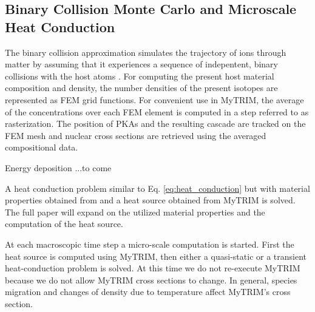 \documentclass{anstrans}
\begin{document}
\subsection{Binary Collision Monte Carlo and Microscale Heat Conduction}
The binary collision approximation simulates the trajectory of ions through matter by assuming that it experiences a sequence of indepentent, binary collisions with the host atoms \cite{SRIM}. For computing the present host material composition and density, the number densities of the present isotopes are represented as FEM grid functions. For convenient use in MyTRIM, the average of the concentrations over each FEM element is computed in a step referred to as rasterization. The position of PKAs and the resulting cascade are tracked on the FEM mesh and nuclear cross sections are retrieved using the averaged compositional data. 

Energy deposition ...to come

A heat conduction problem similar to Eq. \ref{eq:heat_conduction} but with material properties obtained from \cite{Mo2015} and a heat source obtained from MyTRIM is solved. The full paper will expand on the utilized material properties and the computation of the heat source. 

At each macroscopic time step a micro-scale computation is started. First the heat source is computed using MyTRIM, then either a quasi-static or a transient heat-conduction problem is solved. At this time we do not re-execute MyTRIM because we do not allow MyTRIM cross sections to change. In general, species migration and changes of density due to temperature affect MyTRIM's cross section. 

\end{document}
